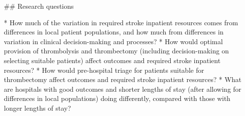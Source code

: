 \begin{markdown}
## Research questions

* How much of the variation in required stroke inpatient resources comes from differences in local patient populations, and how much from differences in variation in clinical decision-making and processes?
* How would optimal provision of thrombolysis and thrombectomy (including decision-making on selecting suitable patients) affect outcomes and required stroke inpatient resources?
* How would pre-hospital triage for patients suitable for thrombectomy affect outcomes and required stroke inpatient resources?
* What are hospitals with good outcomes and shorter lengths of stay (after allowing for differences in local populations) doing differently, compared with those with longer lengths of stay?
\end{markdown}